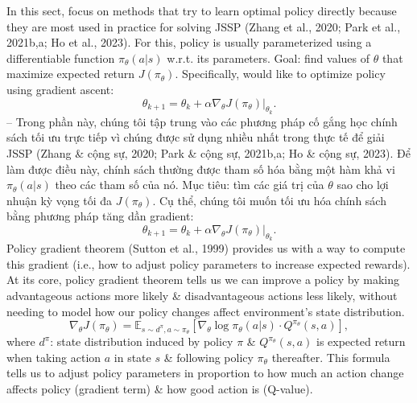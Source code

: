 \documentclass{article}
\begin{document}
\begin{itemize}
\begin{itemize}
\begin{itemize}
            In this sect, focus on methods that try to learn optimal policy directly because they are most used in practice for solving JSSP (Zhang et al., 2020; Park et al., 2021b,a; Ho et al., 2023). For this, policy is usually parameterized using a differentiable function $\pi_\theta(a|s)$ w.r.t. its parameters. Goal: find values of $\theta$ that maximize expected return $J(\pi_\theta)$. Specifically, would like to optimize policy using gradient ascent:
            \begin{equation*}
                \theta_{k+1} = \theta_k + \alpha\nabla_\theta J(\pi_\theta)|_{\theta_k}.
            \end{equation*}
            -- Trong phần này, chúng tôi tập trung vào các phương pháp cố gắng học chính sách tối ưu trực tiếp vì chúng được sử dụng nhiều nhất trong thực tế để giải JSSP (Zhang \& cộng sự, 2020; Park \& cộng sự, 2021b,a; Ho \& cộng sự, 2023). Để làm được điều này, chính sách thường được tham số hóa bằng một hàm khả vi $\pi_\theta(a|s)$ theo các tham số của nó. Mục tiêu: tìm các giá trị của $\theta$ sao cho lợi nhuận kỳ vọng tối đa $J(\pi_\theta)$. Cụ thể, chúng tôi muốn tối ưu hóa chính sách bằng phương pháp tăng dần gradient:
            \begin{equation*}
                \theta_{k+1} = \theta_k + \alpha\nabla_\theta J(\pi_\theta)|_{\theta_k}.
            \end{equation*}
            Policy gradient theorem (Sutton et al., 1999) provides us with a way to compute this gradient (i.e., how to adjust policy parameters to increase expected rewards). At its core, policy gradient theorem tells us we can improve a policy by making advantageous actions more likely \& disadvantageous actions less likely, without needing to model how our policy changes affect environment's state distribution.
            \begin{equation*}
                \nabla_\theta J(\pi_\theta) = \mathbb{E}_{s\sim d^\pi,a\sim\pi_\theta}[\nabla_\theta\log\pi_\theta(a|s)\cdot Q^{\pi_\theta}(s,a)],
            \end{equation*}
            where $d^\pi$: state distribution induced by policy $\pi$ \& $Q^{\pi_\theta}(s,a)$ is expected return when taking action $a$ in state $s$ \& following policy $\pi_\theta$ thereafter. This formula tells us to adjust policy parameters in proportion to how much an action change affects policy (gradient term) \& how good action is (Q-value).


\end{itemize}
\end{itemize}
\end{itemize}
\end{document}
